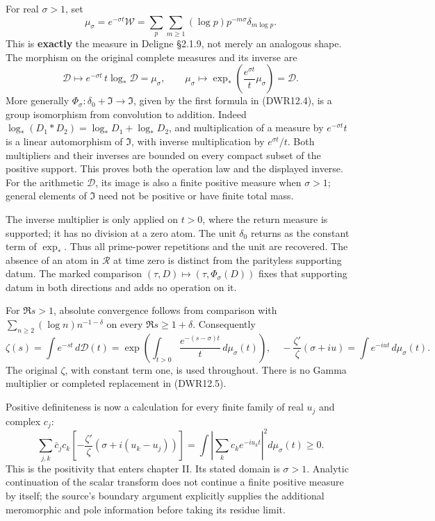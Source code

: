 For real \(\sigma>1\), set \[
\mu_\sigma=e^{-\sigma t}\mathcal W
=\sum_p\sum_{m\ge1}(\log p)p^{-m\sigma}\delta_{m\log p}.
\tag{DWR12.3}
\] This is \textbf{exactly} the measure in Deligne §2.1.9, not merely an
analogous shape. The morphism on the original complete measures and its
inverse are \[
\mathcal D\longmapsto e^{-\sigma t}\,t\log_*\mathcal D=\mu_\sigma,
\qquad
\mu_\sigma\longmapsto
\exp_*\left(\frac{e^{\sigma t}}t\mu_\sigma\right)=\mathcal D.
\tag{DWR12.4}
\] More generally \(\Phi_\sigma:\delta_0+\mathfrak I\to\mathfrak I\),
given by the first formula in (DWR12.4), is a group isomorphism from
convolution to addition. Indeed \(\log_*(D_1*D_2)=\log_*D_1+\log_*D_2\),
and multiplication of a measure by \(e^{-\sigma t}t\) is a linear
automorphism of \(\mathfrak I\), with inverse multiplication by
\(e^{\sigma t}/t\). Both multipliers and their inverses are bounded on
every compact subset of the positive support. This proves both the
operation law and the displayed inverse. For the arithmetic
\(\mathcal D\), its image is also a finite positive measure when
\(\sigma>1\); general elements of \(\mathfrak I\) need not be positive
or have finite total mass.

The inverse multiplier is only applied on \(t>0\), where the return
measure is supported; it has no division at a zero atom. The unit
\(\delta_0\) returns as the constant term of \(\exp_*\). Thus all
prime-power repetitions and the unit are recovered. The absence of an
atom in \(\mathcal R\) at time zero is distinct from the parityless
supporting datum. The marked comparison
\((\tau,D)\mapsto(\tau,\Phi_\sigma(D))\) fixes that supporting datum in
both directions and adds no operation on it.

For \(\Re s>1\), absolute convergence follows from comparison with
\(\sum_{n\ge2}(\log n)n^{-1-\delta}\) on every \(\Re s\ge1+\delta\).
Consequently \[
\zeta(s)=\int e^{-st}\,d\mathcal D(t)
=\exp\left(\int_{t>0}\frac{e^{-(s-\sigma)t}}t\,d\mu_\sigma(t)\right),
\quad
-\frac{\zeta'}{\zeta}(\sigma+iu)=\int e^{-iut}\,d\mu_\sigma(t).
\tag{DWR12.5}
\] The original \(\zeta\), with constant term one, is used throughout.
There is no Gamma multiplier or completed replacement in (DWR12.5).

Positive definiteness is now a calculation for every finite family of
real \(u_j\) and complex \(c_j\): \[
\sum_{j,k}\bar c_jc_k\left[-\frac{\zeta'}\zeta(\sigma+i(u_k-u_j))\right]
=\int\left|\sum_k c_ke^{-iu_kt}\right|^2d\mu_\sigma(t)\ge0.
\tag{DWR12.6}
\] This is the positivity that enters chapter II. Its stated domain is
\(\sigma>1\). Analytic continuation of the scalar transform does not
continue a finite positive measure by itself; the source's boundary
argument explicitly supplies the additional meromorphic and pole
information before taking its residue limit.

